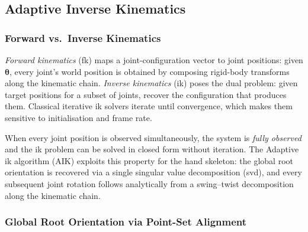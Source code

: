 \subsection{Adaptive Inverse Kinematics}\label{subsec:aik}

\subsubsection{Forward vs.\ Inverse Kinematics}

\emph{Forward kinematics} (\acrshort{fk}) maps a joint-configuration vector
to joint positions: given $\boldsymbol{\theta}$, every joint's world position
is obtained by composing rigid-body transforms along the kinematic chain.
\emph{Inverse kinematics} (\acrshort{ik}) poses the dual problem: given target
positions for a subset of joints, recover the configuration that produces them.
Classical iterative \acrshort{ik} solvers iterate until convergence,
which makes them sensitive to initialisation and frame rate.

When every joint position is observed simultaneously, the system is
\emph{fully observed} and the \acrshort{ik} problem can be solved in closed
form without iteration. The Adaptive \acrshort{ik} algorithm
(AIK) exploits this property for the hand skeleton:
the global root orientation is recovered via a single singular value
decomposition (\acrshort{svd}), and every subsequent joint rotation follows
analytically from a swing--twist decomposition along the kinematic chain.

\subsubsection{Global Root Orientation via Point-Set Alignment}

